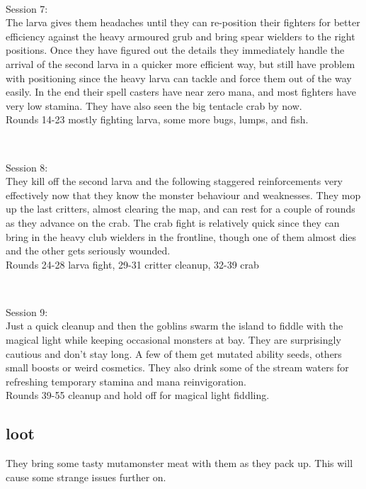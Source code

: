 \

Session 7:\\                                                            %
The larva gives them headaches until they can re-position their fighters for better efficiency against the heavy armoured grub and bring spear wielders to the right positions. Once they have figured out the details they immediately handle the arrival of the second larva in a quicker more efficient way, but still have problem with positioning since the heavy larva can tackle and force them out of the way easily. In the end their spell casters have near zero mana, and most fighters have very low stamina. They have also seen the big tentacle crab by now.\\
Rounds 14-23 mostly fighting larva, some more bugs, lumps, and fish.

\

Session 8:\\                                                            %
They kill off the second larva and the following staggered reinforcements very effectively now that they know the monster behaviour and weaknesses. They mop up the last critters, almost clearing the map, and can rest for a couple of rounds as they advance on the crab. The crab fight is relatively quick since they can bring in the heavy club wielders in the frontline, though one of them almost dies and the other gets seriously wounded.\\
Rounds 24-28 larva fight, 29-31 critter cleanup, 32-39 crab

\

Session 9:\\                                                            %
Just a quick cleanup and then the goblins swarm the island to fiddle with the magical light while keeping occasional monsters at bay. They are surprisingly cautious and don't stay long. A few of them get mutated ability seeds, others small boosts or weird cosmetics. They also drink some of the stream waters for refreshing temporary stamina and mana reinvigoration.\\
Rounds 39-55 cleanup and hold off for magical light fiddling.


\subsection*{loot}

They bring some tasty mutamonster meat with them as they pack up. This will cause some strange issues further on.

